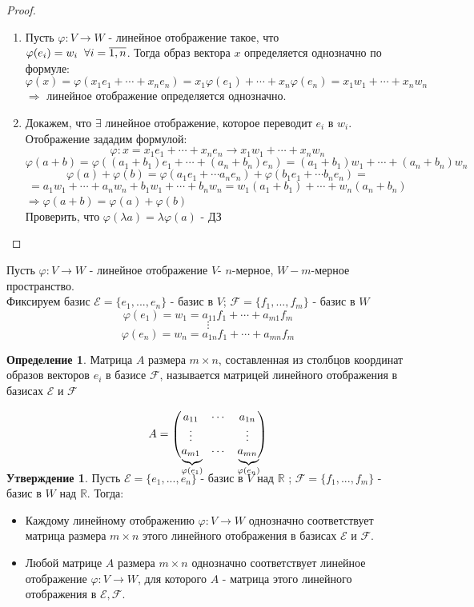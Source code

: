 \documentclass[a4paper, 12pt]{article}
\newcommand{\R}{\mathbb R}
\renewcommand{\phi}{\varphi}
\newcommand\tab[1][.5cm]{\hspace*{#1}}
\newcommand\undermat[2]{\makebox[0pt][l]{$\smash{\underbrace
{\phantom{\begin{matrix}#2\end{matrix}}}_{\text{$#1$}}}$}#2}
\theoremstyle{definition}
\newtheorem*{definition}{Определение}
\newtheorem*{subtheorem}{Утверждение}
\begin{document}
  \begin{proof} \tab
    \begin{enumerate}
      \item Пусть $\phi: V \to W$ - линейное отображение такое, что \\$\phi(e_i) = w_i \tab[0.2cm] \forall i = \overline{1,n}$. Тогда образ вектора $x$ определяется однозначно по формуле: $$\phi(x) = \phi(x_1e_1 + \cdots + x_ne_n) = x_1 \phi(e_1) + \cdots + x_n \phi(e_n) = x_1 w_1 + \cdots + x_n w_n$$
      $\Longrightarrow$ линейное отображение определяется однозначно.
      \item Докажем, что $\exists$ линейное отображение, которое переводит $e_i$ в $w_i$. Отображение зададим формулой: $$\phi: x = x_1e_1 + \cdots + x_ne_n \to x_1w_1 + \cdots + x_nw_n$$
      $$\phi(a+b) = \phi((a_1+b_1)e_1 + \cdots + (a_n + b_n)e_n) = (a_1+b_1)w_1 + \cdots + (a_n + b_n)w_n$$
      $$\phi(a) + \phi(b) = \phi(a_1e_1 + \cdots a_ne_n) + \phi(b_1e_1 + \cdots b_ne_n) = $$ $$= a_1w_1 + \cdots + a_nw_n + b_1w_1 + \cdots + b_nw_n = w_1(a_1 + b_1) + \cdots + w_n(a_n + b_n)$$
      $\Longrightarrow \phi(a+b) = \phi(a) + \phi(b)$\\
      Проверить, что $\phi(\lambda a) = \lambda \phi(a)$ - ДЗ
    \end{enumerate}
  \end{proof} 
  Пусть $\phi: V \to W$ - линейное отображение $V$- $n$-мерное, $W - m$-мерное пространство.  \\
  Фиксируем базис 
  $\mathcal{E}  = \{e_1,...,e_n\}$ - базис в $V$; $\mathcal{F}  = \{f_1,...,f_m\}$ - базис в $W$
  $$\phi(e_1) = w_1 = a_{11}f_1 + \cdots + a_{m1}f_m$$ $$\vdots$$
  $$\phi(e_n) = w_n = a_{1n}f_1 + \cdots + a_{mn}f_m$$

  \begin{definition}
    Матрица $A$ размера $m \times n$,  составленная из столбцов координат образов векторов $e_i$ в базисе $\mathcal{F}$, называется матрицей линейного отображения в базисах $\mathcal{E} $ и $\mathcal{F}$  
  \end{definition} 
  $$A = \begin{pmatrix}
    a_{11} & \cdots & a_{1n} \\
    \vdots & \null & \vdots \\
    \undermat{\phi(e_1)}{a_{m1}}  & \cdots & \undermat{\phi(e_n)}{a_{mn}} 
  \end{pmatrix}$$  
  \vspace{0.3cm}
  \begin{subtheorem}
    Пусть $\mathcal{E}  = \{e_1,...,e_n\}$ - базис в $V$ над $\R$ ; $\mathcal{F}  = \{f_1,...,f_m\}$ - базис в $W$ над $\R$. Тогда:
    \begin{itemize}
      \item Каждому линейному отображению $\phi: V \to W$ однозначно соответствует матрица размера $m \times n$ этого линейного отображения в базисах $\mathcal{E} \text{ и } \mathcal{F}$.
      \item Любой матрице $A$ размера $m \times n$ однозначно соответствует линейное отображение $\phi: V \to W$, для которого $A$ - матрица этого линейного отображения в $\mathcal{E}, \mathcal{F}$.
    \end{itemize}
  \end{subtheorem} 
\end{document}
